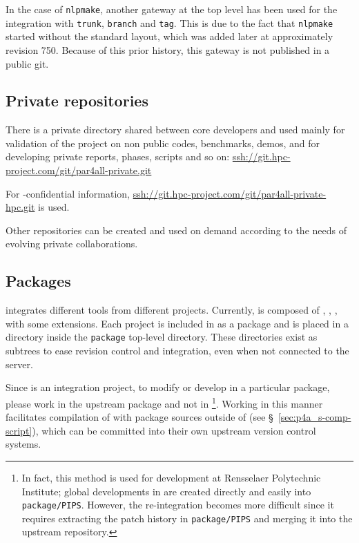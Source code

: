\documentclass[a4paper]{article}
\begin{document}
In the case of \texttt{nlpmake}, another \Agit{} \Asvn gateway at the top
level has been used for the integration with \texttt{trunk},
\texttt{branch} and \texttt{tag}. This is due to the fact that
\texttt{nlpmake} started without the standard
layout, which was added later at approximately revision 750. Because
of this prior history, this gateway is not published in a public git.


\subsection{Private repositories}
\label{sec:private-repositories}

There is a private directory shared between core developers and used mainly
for validation of the project on non public codes, benchmarks, demos,
and for developing private reports, phases, scripts and so on:
\url{ssh://git.hpc-project.com/git/par4all-private.git}

For \Ahpcp-confidential information,
\url{ssh://git.hpc-project.com/git/par4all-private-hpc.git} is used.

Other repositories can be created and used on demand according to the
needs of evolving private collaborations.


\subsection{Packages}
\label{sec:packages}

\Apfa integrates different tools from different projects. Currently, \Apfa
is composed of \Apips, \Apipsgfc, \Apolylib, with some extensions. Each
project is included in \Apfa as a package and is placed in a directory
inside the \texttt{package} top-level directory.
These directories exist as \Agit subtrees to ease revision control and
integration, even when not connected to the \Asvn server.

Since \Apfa is an integration project, to modify or develop in
a particular package, please work in the upstream package and not in
\Apfa\footnote{In fact, this method is used for \Apfa development at Rensselaer
  Polytechnic Institute; global developments in \Apips are created
  directly and easily into \texttt{package/PIPS}. However,
  the re-integration becomes more difficult since it requires extracting the
  patch history in \texttt{package/PIPS} and merging it into the \Apips
  upstream \Asvn repository.}. Working in this manner facilitates
compilation of \Apfa with package sources outside of \Apfa (see
\S~\ref{sec:p4a_s-comp-script}), which can be committed into their own upstream
version control systems.
\end{document}
